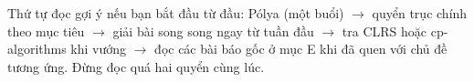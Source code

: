 \documentclass[algorithm.tex]{subfiles}
\begin{document}
\begin{cannho}
Thứ tự đọc gợi ý nếu bạn bắt đầu từ đầu: Pólya (một buổi) \(\rightarrow\) quyển trục chính theo mục tiêu \(\rightarrow\) giải bài song song ngay từ tuần đầu \(\rightarrow\) tra CLRS hoặc cp-algorithms khi vướng \(\rightarrow\) đọc các bài báo gốc ở mục E khi đã quen với chủ đề tương ứng. Đừng đọc quá hai quyển cùng lúc.
\end{cannho}
\end{document}
